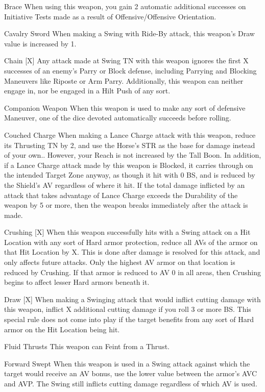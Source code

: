 \documentclass[oneside,11pt,english]{book}
\begin{document}
Brace When using this weapon, you gain 2 automatic additional successes on Initiative Tests made as a result of Offensive/Offensive Orientation.

Cavalry Sword When making a Swing with Ride-By attack, this weapon’s Draw value is increased by 1.

Chain [X] Any attack made at Swing TN with this weapon ignores the first X successes of an enemy’s Parry or Block defense, including Parrying and Blocking Maneuvers like Riposte or Arm Parry. Additionally, this weapon can neither engage in, nor be engaged in a Hilt Push of any sort.

Companion Weapon When this weapon is used to make any sort of defensive Maneuver, one of the dice devoted automatically succeeds before rolling.

Couched Charge When making a Lance Charge attack with this weapon, reduce its Thrusting TN by 2, and use the Horse’s STR as the base for damage instead of your own.. However, your Reach is not increased by the Tall Boon. In addition, if a Lance Charge attack made by this weapon is Blocked, it carries through on the intended Target Zone anyway, as though it hit with 0 BS, and is reduced by the Shield’s AV regardless of where it hit. If the total damage inflicted by an attack that takes advantage of Lance Charge exceeds the Durability of the weapon by 5 or more, then the weapon breaks immediately after the attack is made.

Crushing [X] When this weapon successfully hits with a Swing attack on a Hit Location with any sort of Hard armor protection, reduce all AVs of the armor on that Hit Location by X. This is done after damage is resolved for this attack, and only affects future attacks. Only the highest AV armor on that location is reduced by Crushing. If that armor is reduced to AV 0 in all areas, then Crushing begins to affect lesser Hard armors beneath it. 

Draw [X] When making a Swinging attack that would inflict cutting damage with this weapon, inflict X additional cutting damage if you roll 3 or more BS. This special rule does not come into play if the target benefits from any sort of Hard armor on the Hit Location being hit.

Fluid Thrusts This weapon can Feint from a Thrust.

Forward Swept When this weapon is used in a Swing attack against which the target would receive an AV bonus, use the lower value between the armor’s AVC and AVP. The Swing still inflicts cutting damage regardless of which AV is used.
\end{document}
